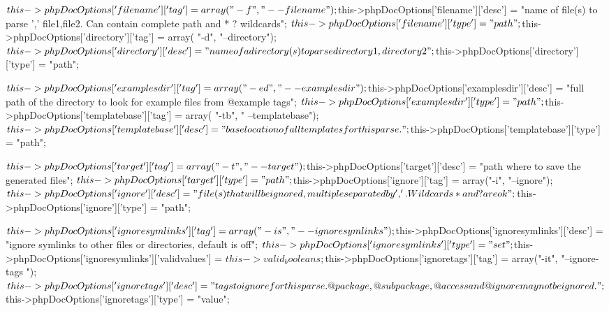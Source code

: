 \begin{DoxyCode}
    {
        $this->phpDocOptions['filename']['tag'] = array( "-f", "--filename");
        $this->phpDocOptions['filename']['desc'] = "name of file(s) to parse
       ',' file1,file2.  Can contain complete path and * ? wildcards";
        $this->phpDocOptions['filename']['type'] = "path";

        $this->phpDocOptions['directory']['tag'] = array( "-d", "--directory");
        $this->phpDocOptions['directory']['desc'] = "name of a directory(s) to
       parse directory1,directory2";
        $this->phpDocOptions['directory']['type'] = "path";

        $this->phpDocOptions['examplesdir']['tag'] = array( "-ed", "
      --examplesdir");
        $this->phpDocOptions['examplesdir']['desc'] = "full path of the
       directory to look for example files from @example tags";
        $this->phpDocOptions['examplesdir']['type'] = "path";

        $this->phpDocOptions['templatebase']['tag'] = array( "-tb", "
      --templatebase");
        $this->phpDocOptions['templatebase']['desc'] = "base location of all
       templates for this parse.";
        $this->phpDocOptions['templatebase']['type'] = "path";

        $this->phpDocOptions['target']['tag'] = array("-t", "--target");
        $this->phpDocOptions['target']['desc'] = "path where to save the
       generated files";
        $this->phpDocOptions['target']['type'] = "path";
        
        $this->phpDocOptions['ignore']['tag'] = array("-i", "--ignore");
        $this->phpDocOptions['ignore']['desc'] = "file(s) that will be ignored,
       multiple separated by ','.  Wildcards * and ? are ok";
        $this->phpDocOptions['ignore']['type'] = "path";

        $this->phpDocOptions['ignoresymlinks']['tag'] = array("-is", "
      --ignoresymlinks");
        $this->phpDocOptions['ignoresymlinks']['desc'] = "ignore symlinks to
       other files or directories, default is off";
        $this->phpDocOptions['ignoresymlinks']['type'] = "set";
        $this->phpDocOptions['ignoresymlinks']['validvalues'] = $this->
      valid_booleans;

        $this->phpDocOptions['ignoretags']['tag'] = array("-it", "--ignore-tags
      ");
        $this->phpDocOptions['ignoretags']['desc'] = "tags to ignore for this
       parse.  @package, @subpackage, @access and @ignore may not be ignored.";
        $this->phpDocOptions['ignoretags']['type'] = "value";

}
\end{DoxyCode}
